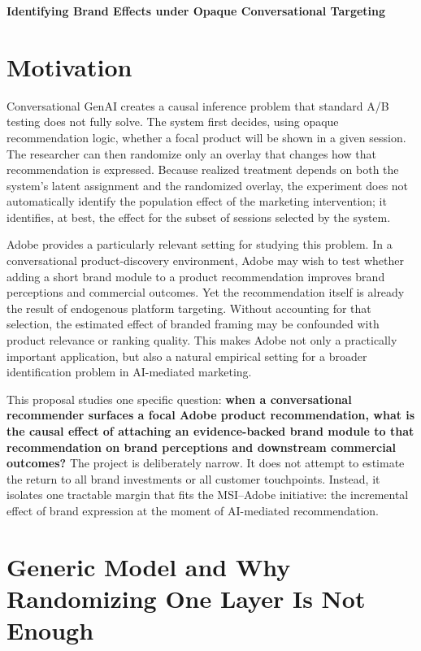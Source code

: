 \documentclass[11pt]{article}
\begin{document}
\begin{center}
{\LARGE \textbf{Identifying Brand Effects under Opaque Conversational Targeting}}\\[0.3em]
\end{center}

\section{Motivation}

Conversational GenAI creates a causal inference problem that standard A/B testing does not fully solve. The system first decides, using opaque recommendation logic, whether a focal product will be shown in a given session. The researcher can then randomize only an overlay that changes how that recommendation is expressed. Because realized treatment depends on both the system's latent assignment and the randomized overlay, the experiment does not automatically identify the population effect of the marketing intervention; it identifies, at best, the effect for the subset of sessions selected by the system.

Adobe provides a particularly relevant setting for studying this problem. In a conversational product-discovery environment, Adobe may wish to test whether adding a short brand module to a product recommendation improves brand perceptions and commercial outcomes. Yet the recommendation itself is already the result of endogenous platform targeting. Without accounting for that selection, the estimated effect of branded framing may be confounded with product relevance or ranking quality. This makes Adobe not only a practically important application, but also a natural empirical setting for a broader identification problem in AI-mediated marketing.

This proposal studies one specific question: \textbf{when a conversational recommender surfaces a focal Adobe product recommendation, what is the causal effect of attaching an evidence-backed brand module to that recommendation on brand perceptions and downstream commercial outcomes?} The project is deliberately narrow. It does not attempt to estimate the return to all brand investments or all customer touchpoints. Instead, it isolates one tractable margin that fits the MSI--Adobe initiative: the incremental effect of brand expression at the moment of AI-mediated recommendation.

\section{Generic Model and Why Randomizing One Layer Is Not Enough}
\end{document}
